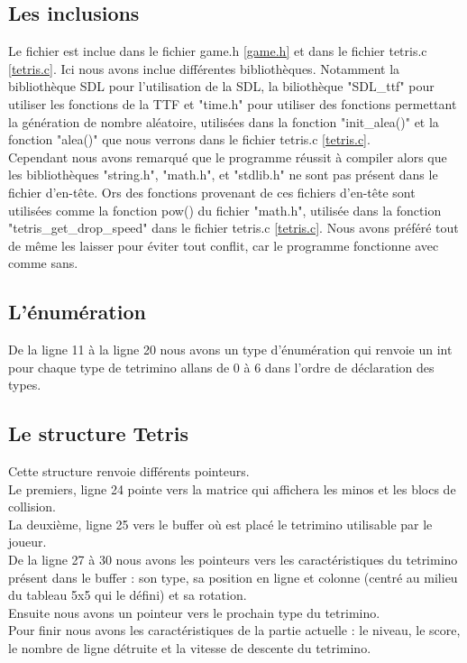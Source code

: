 \documentclass[a4paper,10p]{report}
\begin{document}
\subsection{Les inclusions}
Le fichier est inclue dans le fichier game.h \ref{game.h} et dans le fichier tetris.c \ref{tetris.c}. Ici nous avons inclue différentes bibliothèques. Notamment la bibliothèque SDL pour l'utilisation de la SDL, la biliothèque "SDL\_ttf" pour utiliser les fonctions de la TTF et "time.h" pour utiliser des fonctions permettant la génération de nombre aléatoire, utilisées dans la fonction "init\_alea()" et la fonction "alea()" que nous verrons dans le fichier tetris.c \ref{tetris.c}.
\\Cependant nous avons remarqué que le programme réussit à compiler alors que les bibliothèques "string.h", "math.h", et "stdlib.h" ne sont pas présent dans le fichier d'en-tête. Ors des fonctions provenant de ces fichiers d'en-tête sont utilisées comme la fonction pow() du fichier "math.h", utilisée dans la fonction "tetris\_get\_drop\_speed" dans le fichier tetris.c \ref{tetris.c}. Nous avons préféré tout de même les laisser pour éviter tout conflit, car le programme fonctionne avec comme sans.
\subsection{L'énumération}
De la ligne \textcolor{gris}{11} à la ligne \textcolor{gris}{20} nous avons un type d'énumération qui renvoie un int pour chaque type de tetrimino allans de 0 à 6 dans l'ordre de déclaration des types.
\subsection{Le structure Tetris}
Cette structure renvoie différents pointeurs.
\\Le premiers, ligne \textcolor{gris}{24} pointe vers la matrice qui affichera les minos et les blocs de collision.
\\La deuxième, ligne \textcolor{gris}{25} vers le buffer où est placé le tetrimino utilisable par le joueur.
\\De la ligne \textcolor{gris}{27} à \textcolor{gris}{30} nous avons les pointeurs vers les caractéristiques du tetrimino présent dans le buffer : son type, sa position en ligne et colonne (centré au milieu du tableau 5x5 qui le défini) et sa rotation.
\\Ensuite nous avons un pointeur vers le prochain type du tetrimino.
\\Pour finir nous avons les caractéristiques de la partie actuelle : le niveau, le score, le nombre de ligne détruite et la vitesse de descente du tetrimino.
\end{document}
